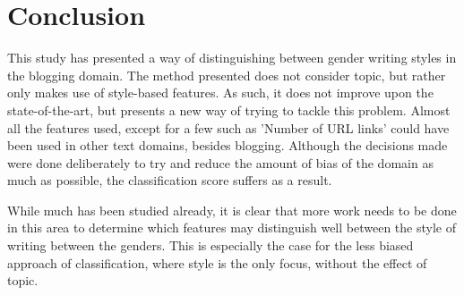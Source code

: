\documentclass{article}
\begin{document}




\section{Conclusion}
This study  has presented a way of distinguishing between gender writing styles in the blogging domain. The method presented does not consider topic, but rather only makes use of style-based features. As such, it does not improve upon the state-of-the-art, but presents a new way of trying to tackle this problem. Almost all the features used, except for a few such as 'Number of URL links' could have been used in other text domains, besides blogging. Although the decisions made were done deliberately to try and reduce the amount of bias of the domain as much as possible, the classification score suffers as a result.

While much has been studied already, it is clear that more work needs to be done in this area to determine which features may distinguish well between the style of writing between the genders. This is especially the case for the less biased approach of classification, where style is the only focus, without the effect of topic.

\pagebreak




\pagebreak


\end{document}
